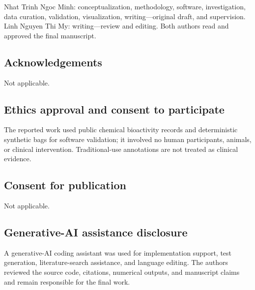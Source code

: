 \documentclass[11pt]{article}
\begin{document}
Nhat Trinh Ngoc Minh: conceptualization, methodology, software, investigation,
data curation, validation, visualization, writing---original draft, and
supervision. Linh Nguyen Thi My: writing---review and editing. Both authors
read and approved the final manuscript.

\subsection*{Acknowledgements}

Not applicable.

\subsection*{Ethics approval and consent to participate}

The reported work used public chemical bioactivity records and deterministic
synthetic bags for software validation; it involved no human participants,
animals, or clinical intervention. Traditional-use annotations are not treated
as clinical evidence.

\subsection*{Consent for publication}

Not applicable.

\subsection*{Generative-AI assistance disclosure}

A generative-AI coding assistant was used for implementation support, test
generation, literature-search assistance, and language editing. The authors
reviewed the source code, citations, numerical outputs, and manuscript claims
and remain responsible for the final work.



\end{document}

